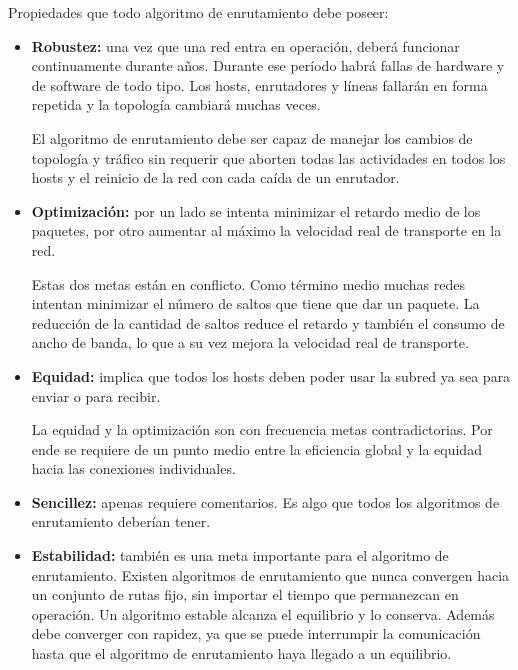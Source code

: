 \documentclass[10pt,a4paper]{report}
\begin{document}
	\par Propiedades que todo algoritmo de enrutamiento debe poseer:
		\begin{itemize}
			\item \textbf{Robustez:} una vez que una red entra en operación, deberá
			funcionar 			
			continuamente durante años. Durante ese período habrá fallas de hardware y de 
			software de todo tipo. Los hosts, enrutadores y líneas fallarán en forma 
			repetida y la topología cambiará muchas veces.
			\par El algoritmo de enrutamiento debe ser capaz de manejar los cambios de 
			topología y tráfico sin requerir que aborten todas las actividades en todos los 
			hosts y el reinicio de la red con cada caída de un enrutador.
			\item \textbf{Optimización:} por un lado se intenta minimizar el 
			retardo medio de los paquetes, por otro aumentar al máximo la velocidad real 
			de transporte en la red. 
			\par Estas dos metas están en conflicto. Como término medio muchas redes 
			intentan minimizar el número de saltos que tiene que dar un paquete.
			La reducción de la cantidad de saltos reduce el retardo y también el consumo 
			de ancho de banda, lo que a su vez mejora la velocidad real de transporte.
			\item \textbf{Equidad:} implica que todos los hosts deben poder usar la subred 
			ya sea para enviar o para recibir.
			\par La equidad y la optimización son con frecuencia metas contradictorias. Por 
			ende se requiere de un punto medio entre la eficiencia global y la equidad hacia 
			las conexiones individuales.
			\item \textbf{Sencillez:} apenas requiere comentarios. Es algo que todos los 
			algoritmos de enrutamiento deberían tener. 
			\item \textbf{Estabilidad:} también es una meta importante para el algoritmo 
			de enrutamiento. Existen algoritmos de enrutamiento que nunca convergen 
			hacia un conjunto de rutas fijo, sin importar el tiempo que permanezcan en 
			operación. Un algoritmo estable alcanza el equilibrio y lo conserva. Además 
			debe converger con rapidez, ya que se puede interrumpir la comunicación hasta 
			que el algoritmo de enrutamiento haya llegado a un equilibrio.
		\end{itemize}
		
\end{document}
